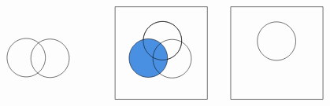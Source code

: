 \documentclass[12pt]{article}
\begin{document}
\[\begin{tikzpicture}[x=0.75pt,y=0.75pt,yscale=-1.08,xscale=1.08]
    \draw   (38.52,67.05) .. controls (38.52,55.14) and (48.18,45.48) .. (60.1,45.48) .. controls (72.01,45.48) and (81.67,55.14) .. (81.67,67.05) .. controls (81.67,78.97) and (72.01,88.63) .. (60.1,88.63) .. controls (48.18,88.63) and (38.52,78.97) .. (38.52,67.05) -- cycle ;
    \draw   (65.29,67.76) .. controls (65.29,55.84) and (74.95,46.18) .. (86.87,46.18) .. controls (98.78,46.18) and (108.45,55.84) .. (108.45,67.76) .. controls (108.45,79.67) and (98.78,89.34) .. (86.87,89.34) .. controls (74.95,89.34) and (65.29,79.67) .. (65.29,67.76) -- cycle ;
    \draw   (160,10) -- (263.74,10) -- (263.74,113.74) -- (160,113.74) -- cycle ;
    \draw   (191.7,48.04) .. controls (191.7,36.13) and (201.36,26.47) .. (213.28,26.47) .. controls (225.2,26.47) and (234.86,36.13) .. (234.86,48.04) .. controls (234.86,59.96) and (225.2,69.62) .. (213.28,69.62) .. controls (201.36,69.62) and (191.7,59.96) .. (191.7,48.04) -- cycle ;
    \draw  [fill={rgb, 255:red, 74; green, 144; blue, 226 }  ,fill opacity=1 ] (175.76,67.51) .. controls (175.76,55.59) and (185.42,45.93) .. (197.34,45.93) .. controls (209.26,45.93) and (218.92,55.59) .. (218.92,67.51) .. controls (218.92,79.42) and (209.26,89.08) .. (197.34,89.08) .. controls (185.42,89.08) and (175.76,79.42) .. (175.76,67.51) -- cycle ;
    \draw   (202.53,68.21) .. controls (202.53,56.29) and (212.19,46.63) .. (224.11,46.63) .. controls (236.03,46.63) and (245.69,56.29) .. (245.69,68.21) .. controls (245.69,80.13) and (236.03,89.79) .. (224.11,89.79) .. controls (212.19,89.79) and (202.53,80.13) .. (202.53,68.21) -- cycle ;
    \draw   (191.7,48.04) .. controls (191.7,36.13) and (201.36,26.47) .. (213.28,26.47) .. controls (225.2,26.47) and (234.86,36.13) .. (234.86,48.04) .. controls (234.86,59.96) and (225.2,69.62) .. (213.28,69.62) .. controls (201.36,69.62) and (191.7,59.96) .. (191.7,48.04) -- cycle ;
    \draw   (290,10) -- (393.74,10) -- (393.74,113.74) -- (290,113.74) -- cycle ;
    \draw   (319.94,48.5) .. controls (319.94,36.58) and (329.61,26.92) .. (341.52,26.92) .. controls (353.44,26.92) and (363.1,36.58) .. (363.1,48.5) .. controls (363.1,60.41) and (353.44,70.07) .. (341.52,70.07) .. controls (329.61,70.07) and (319.94,60.41) .. (319.94,48.5) -- cycle ;

\end{tikzpicture}\]
\end{document}
